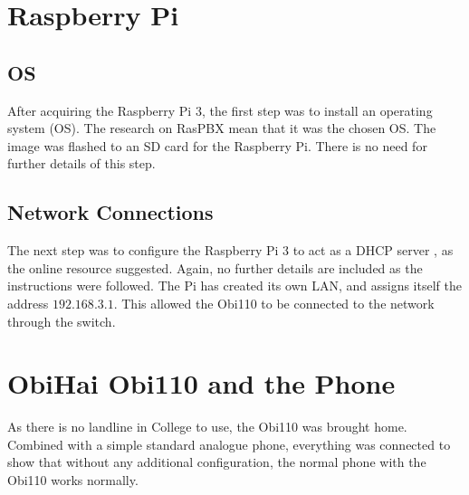 \documentclass[main.tex]{subfiles}
\begin{document}

\section{Raspberry Pi}
\subsection{OS}
After acquiring the Raspberry Pi 3, the first step was to install an operating system (OS). The research on RasPBX \cite{raspbx} mean that it was the chosen OS. The image was flashed to an SD card for the Raspberry Pi. There is no need for further details of this step.

\subsection{Network Connections}
The next step was to configure the Raspberry Pi 3 to act as a DHCP server \cite{pi-dhcp}, as the online resource suggested. Again, no further details are included as the instructions were followed. The Pi has created its own LAN, and assigns itself the address $192.168.3.1$. This allowed the Obi110 to be connected to the network through the switch.

\section{ObiHai Obi110 and the Phone}
As there is no landline in College to use, the Obi110 was brought home. Combined with a simple standard analogue phone, everything was connected to show that without any additional configuration, the normal phone with the Obi110 works normally.
\end{document}
